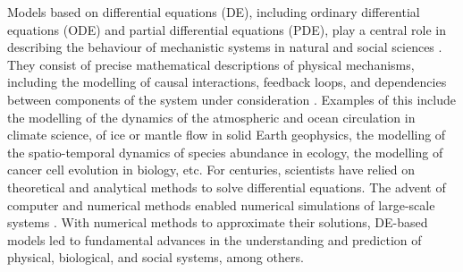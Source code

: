 Models based on differential equations (DE), including ordinary differential equations (ODE) and partial differential equations (PDE), play a central role in describing the behaviour of mechanistic systems in natural and social sciences \cite{Ghattas.2021}.
They consist of precise mathematical descriptions of physical mechanisms, including the modelling of causal interactions, feedback loops, and dependencies between components of the system under consideration \cite{rackauckas2020universal}.
Examples of this include the modelling of the dynamics of the atmospheric and ocean circulation in climate science, of ice or mantle flow in solid Earth geophysics, the modelling of the spatio-temporal dynamics of species abundance in ecology, the modelling of cancer cell evolution in biology, etc.  
For centuries, scientists have relied on theoretical and analytical methods to solve differential equations. 
The advent of computer and numerical methods enabled numerical simulations of large-scale systems \cite{Dahlquist_1985, hey2009, Rude:2018jv}.
With numerical methods to approximate their solutions, DE-based models led to fundamental advances in the understanding and prediction of physical, biological, and social systems, among others.


